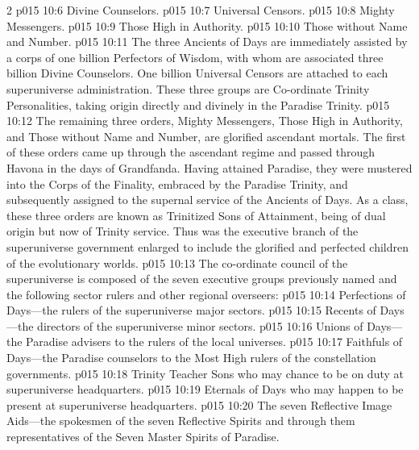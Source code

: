 \begin{multicols}{2}
\vs p015 10:6 \bibnobreakspace Divine Counselors.
\vs p015 10:7 \bibnobreakspace Universal Censors.
\vs p015 10:8 \bibnobreakspace Mighty Messengers.
\vs p015 10:9 \bibnobreakspace Those High in Authority.
\vs p015 10:10 \bibnobreakspace Those without Name and Number.
\pc \vs p015 10:11 The three Ancients of Days are immediately assisted by a corps of one billion Perfectors of Wisdom, with whom are associated three billion Divine Counselors. One billion Universal Censors are attached to each superuniverse administration. These three groups are Co\hyp{}ordinate Trinity Personalities, taking origin directly and divinely in the Paradise Trinity.
\vs p015 10:12 The remaining three orders, Mighty Messengers, Those High in Authority, and Those without Name and Number, are glorified ascendant mortals. The first of these orders came up through the ascendant regime and passed through Havona in the days of Grandfanda. Having attained Paradise, they were mustered into the Corps of the Finality, embraced by the Paradise Trinity, and subsequently assigned to the supernal service of the Ancients of Days. As a class, these three orders are known as Trinitized Sons of Attainment, being of dual origin but now of Trinity service. Thus was the executive branch of the superuniverse government enlarged to include the glorified and perfected children of the evolutionary worlds.
\vs p015 10:13 The co\hyp{}ordinate council of the superuniverse is composed of the seven executive groups previously named and the following sector rulers and other regional overseers:
\pc \vs p015 10:14 \bibnobreakspace Perfections of Days---the rulers of the superuniverse major sectors.
\vs p015 10:15 \bibnobreakspace Recents of Days---the directors of the superuniverse minor sectors.
\vs p015 10:16 \bibnobreakspace Unions of Days---the Paradise advisers to the rulers of the local universes.
\vs p015 10:17 \bibnobreakspace Faithfuls of Days---the Paradise counselors to the Most High rulers of the constellation governments.
\vs p015 10:18 \bibnobreakspace Trinity Teacher Sons who may chance to be on duty at superuniverse headquarters.
\vs p015 10:19 \bibnobreakspace Eternals of Days who may happen to be present at superuniverse headquarters.
\vs p015 10:20 \bibnobreakspace The seven Reflective Image Aids---the spokesmen of the seven Reflective Spirits and through them representatives of the Seven Master Spirits of Paradise.

\end{multicols}
